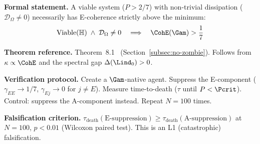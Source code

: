 \begin{predictionbox}
\textbf{Formal statement.}
A viable system ($P > 2/7$) with non-trivial dissipation ($\mathcal{D}_\Omega \neq 0$)
necessarily has E-coherence strictly above the minimum:
\begin{equation}
  \mathrm{Viable}(\mathbb{H}) \;\wedge\; \mathcal{D}_\Omega \neq 0
  \quad\Longrightarrow\quad
  \CohE(\Gam) > \frac{1}{7}
\end{equation}

\medskip\noindent
\textbf{Theorem reference.} Theorem~8.1~ (Section~\ref{subsec:no-zombie}). Follows from
$\kappa \propto \CohE$ and the spectral gap $\Delta(\Lind_0) > 0$.

\medskip\noindent
\textbf{Verification protocol.}
Create a $\Gam$-native agent. Suppress the E-component ($\gamma_{EE} \to 1/7$,
$\gamma_{Ej} \to 0$ for $j \neq E$). Measure time-to-death ($\tau$ until $P < \Pcrit$).
Control: suppress the A-component instead. Repeat $N = 100$ times.

\medskip\noindent
\textbf{Falsification criterion.}
$\tau_{\mathrm{death}}(\text{E-suppression}) \geq \tau_{\mathrm{death}}(\text{A-suppression})$
at $N = 100$, $p < 0.01$ (Wilcoxon paired test). This is an L1 (catastrophic) falsification.
\end{predictionbox}

